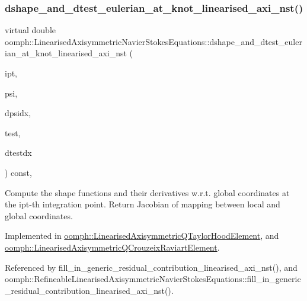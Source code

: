 \subsubsection{\texorpdfstring{dshape\+\_\+and\+\_\+dtest\+\_\+eulerian\+\_\+at\+\_\+knot\+\_\+linearised\+\_\+axi\+\_\+nst()}{dshape\_and\_dtest\_eulerian\_at\_knot\_linearised\_axi\_nst()}}
{\footnotesize\ttfamily virtual double oomph\+::\+Linearised\+Axisymmetric\+Navier\+Stokes\+Equations\+::dshape\+\_\+and\+\_\+dtest\+\_\+eulerian\+\_\+at\+\_\+knot\+\_\+linearised\+\_\+axi\+\_\+nst (\begin{DoxyParamCaption}\item[{const unsigned \&}]{ipt,  }\item[{\hyperlink{classoomph_1_1Shape}{Shape} \&}]{psi,  }\item[{\hyperlink{classoomph_1_1DShape}{D\+Shape} \&}]{dpsidx,  }\item[{\hyperlink{classoomph_1_1Shape}{Shape} \&}]{test,  }\item[{\hyperlink{classoomph_1_1DShape}{D\+Shape} \&}]{dtestdx }\end{DoxyParamCaption}) const\hspace{0.3cm}{\ttfamily [protected]}, {}}



Compute the shape functions and their derivatives w.\+r.\+t. global coordinates at the ipt-\/th integration point. Return Jacobian of mapping between local and global coordinates. 



Implemented in \hyperlink{classoomph_1_1LinearisedAxisymmetricQTaylorHoodElement_a2062342b02d9d638070107ee3f1e5a70}{oomph\+::\+Linearised\+Axisymmetric\+Q\+Taylor\+Hood\+Element}, and \hyperlink{classoomph_1_1LinearisedAxisymmetricQCrouzeixRaviartElement_a5de687eab43c1a20f7999983d8178347}{oomph\+::\+Linearised\+Axisymmetric\+Q\+Crouzeix\+Raviart\+Element}.



Referenced by fill\+\_\+in\+\_\+generic\+\_\+residual\+\_\+contribution\+\_\+linearised\+\_\+axi\+\_\+nst(), and oomph\+::\+Refineable\+Linearised\+Axisymmetric\+Navier\+Stokes\+Equations\+::fill\+\_\+in\+\_\+generic\+\_\+residual\+\_\+contribution\+\_\+linearised\+\_\+axi\+\_\+nst().

\mbox{\label{classoomph_1_1LinearisedAxisymmetricNavierStokesEquations_a0c2247614d1d1414dc53cde8e755e836}} 
